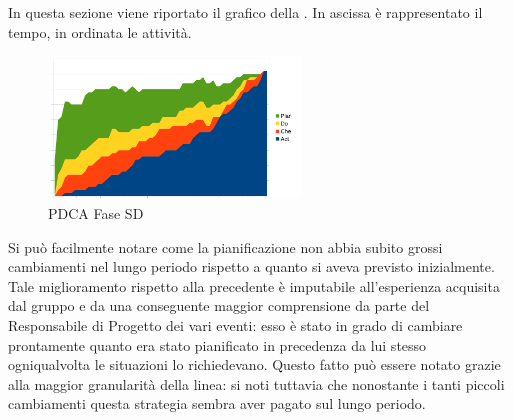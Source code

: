 		In questa sezione viene riportato il grafico  della . In ascissa è rappresentato il tempo, in ordinata le attività.
		\begin{figure}[H]
			\centering
			\includegraphics[width=0.6\textwidth]{PianoDiQualifica/Pics/GraficoPDCAFaseSD.pdf}
			\caption{PDCA Fase SD}
		\end{figure}
		Si può facilmente notare come la pianificazione non abbia subito grossi cambiamenti nel lungo periodo rispetto a quanto si aveva previsto inizialmente. Tale miglioramento rispetto alla  precedente è imputabile all'esperienza acquisita dal gruppo e da una conseguente maggior comprensione da parte del Responsabile di Progetto dei vari eventi: esso è stato in grado di cambiare prontamente quanto era stato pianificato in precedenza da lui stesso ogniqualvolta le situazioni lo richiedevano. Questo fatto può essere notato grazie alla maggior granularità della linea: si noti tuttavia che nonostante i tanti piccoli cambiamenti questa strategia sembra aver pagato sul lungo periodo.

